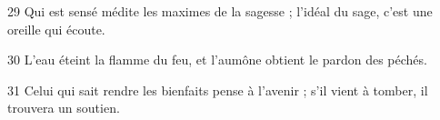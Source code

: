 
29 Qui est sensé médite les maximes de la sagesse ; l’idéal du sage, c’est une oreille qui écoute.

30 L’eau éteint la flamme du feu, et l’aumône obtient le pardon des péchés.

31 Celui qui sait rendre les bienfaits pense à l’avenir ; s’il vient à tomber, il trouvera un soutien.